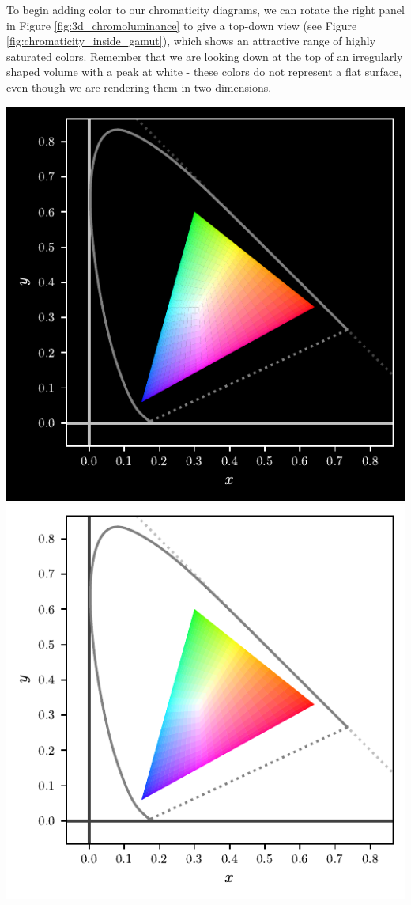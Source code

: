 \documentclass{article}
\newenvironment{halffigure}
    {\par\medskip\noindent\minipage{\linewidth}}
    {\endminipage\par\medskip}
\newif\ifinvert
\begin{document}
\begin{multicols}{2}
To begin adding color to our chromaticity diagrams, we can rotate the right panel in Figure \ref{fig:3d_chromoluminance} to give a top-down view (see Figure \ref{fig:chromaticity_inside_gamut}), which shows an attractive range of highly saturated colors.  Remember that we are looking down at the top of an irregularly shaped volume with a peak at white - these colors do not represent a flat surface, even though we are rendering them in two dimensions.

\begin{halffigure} %
    \ifinvert
        \includegraphics{../images/figure_14_chromaticity_inside_gamut_inverted.pdf}
    \else
        \includegraphics{../images/figure_14_chromaticity_inside_gamut.pdf}

\end{halffigure}
\end{multicols}
\end{document}
